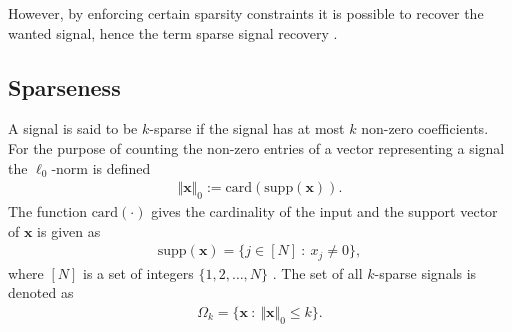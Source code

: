 However, by enforcing certain sparsity constraints it is possible to recover the wanted signal, hence the term sparse signal recovery \cite{FR}.

\subsection{Sparseness} 
A signal is said to be $k$-sparse if the signal has at most $k$ non-zero coefficients. 
For the purpose of counting the non-zero entries of a vector representing a signal the $\ell_0$-norm is defined
\begin{align*}
\Vert \mathbf{x} \Vert_0 := \text{card}(\text{supp}(\mathbf{x})).
\end{align*}
The function $\text{card}(\cdot)$ gives the cardinality of the input and the support vector of $\mathbf{x}$ is given as
\begin{align*}
\text{supp}(\mathbf{x}) = \{ j \in [N] \ : \ x_j \neq 0 \},
\end{align*} 
where $[N]$ is a set of integers $\lbrace 1, 2, \hdots, N \rbrace$ \cite[p. 41]{FR}. 
The set of all $k$-sparse signals is denoted as
\begin{align*}
\Omega_k = \{ \mathbf{x} \ : \ \Vert \mathbf{x} \Vert_0 \leq k \}.
\end{align*}

